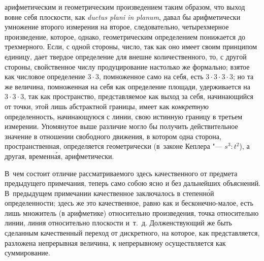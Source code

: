 арифметическим и геометрическим произведением таким образом, что выход вовне
себя плоскости, как {\em ductus plani in planum}, давал бы арифметически
умножение второго измерения на второе, следовательно, четырехмерное
произведение, которое, однако, геометрическим определением понижается до
трехмерного. Если, с одной стороны, число, так как оно имеет своим принципом
единицу, дает твердое определение для внешне количественного, то, с другой
стороны, свойственное числу продуцирование настолько же формально; взятое как
числовое определение $3\cdot 3$, помноженное само на себя, есть
$3\cdot 3\cdot 3\cdot 3$; но та же величина, помноженная на себя как определение
площади, удерживается на $3\cdot 3\cdot 3$, так как пространство,
представляемое как выход за себя, начинающийся от точки, этой лишь абстрактной
границы, имеет как {\em конкретную} определенность, начинающуюся с линии, свою
истинную границу в третьем измерении. Упомянутое выше различие могло бы
получить действительное значение в отношении свободного движения, в котором
одна сторона, пространственная, определяется геометрически (в~законе Кеплера
"--- $s^3:t^2$), а другая, временн\'{а}я, арифметически.

В~чем состоит отличие рассматриваемого здесь качественного от предмета
предыдущего примечания, теперь само собою ясно и без дальнейших объяснений.
В~предыдущем примечании качественное заключалось в степенн\'{о}й
определенности; здесь же это качественное, равно как и бесконечно-малое, есть
лишь множитель (в арифметике) относительно произведения, точка относительно
линии, линия относительно плоскости и~т.~д. Долженствующий же быть сделанным
качественный переход от дискретного, на которое, как представляется, разложена
непрерывная величина, к непрерывному осуществляется как суммирование.

